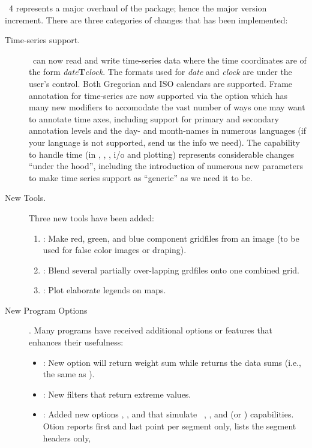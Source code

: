 \GMT\ 4 represents a major overhaul of the package; hence the major version increment.  There are three
categories of changes that has been implemented:
\begin{description}
\item [Time-series support.]  \GMT\ can now read and write time-series data where
the time coordinates are of the form {\it date}{\bf T}{\it clock}.  The formats
used for {\it date} and {\it clock} are under the user's control.  Both Gregorian
and ISO calendars are supported.  Frame annotation for time-series are now supported
via the  option which has many new modifiers to accomodate the vast number of
ways one may want to annotate time axes, including support for primary and secondary
annotation levels and the day- and month-names in numerous languages (if your language
is not supported, send us the info we need).  The capability to handle time (in ,
, , i/o and plotting) represents considerable changes ``under the hood'',
including the introduction of numerous new  parameters to make
time series support as ``generic'' as we need it to be.
\item [New Tools.]  Three new tools have been added:
\begin{enumerate}
\item {}: Make red, green, and blue component gridfiles from an image (to be
used for false color images or draping).
\item {}: Blend several partially over-lapping grdfiles onto one combined grid.
\item {}: Plot elaborate legends on maps.
\end{enumerate}
\item [New Program Options].  Many programs have received additional options or
features that enhances their usefulness:
\begin{itemize}
\item {}:	New option  will return weight sum while  returns
the data sums (i.e., the same as ).
\item {}:	New filters  that return extreme values.
\item {}:	Added new options , ,  and  that simulate
\UNIX\ , , and   (or ) capabilities.
Otion  reports first and last point per segment only,  lists the segment headers only,

\end{itemize}
\end{description}
